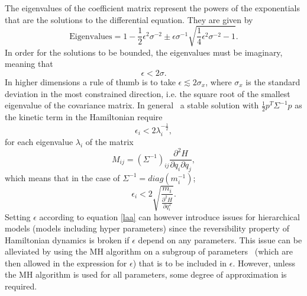 The eigenvalues of the coefficient matrix represent the powers of the exponentials that are the solutions to the differential equation. They are given by
\begin{equation}
	\text{Eigenvalues}=1-\frac{1}{2}\epsilon^2\sigma^{-2}\pm \epsilon\sigma^{-1}\sqrt{\frac{1}{4}\epsilon^2\sigma^{-2}-1}.
\end{equation}
In order for the solutions to be bounded, the eigenvalues must be imaginary, meaning that
\begin{equation}
	\epsilon<2 \sigma.
	\label{gh}
\end{equation}
In higher dimensions a rule of thumb is to take $\epsilon\lesssim 2\sigma_x$, where $\sigma_x$ is the standard deviation in the most constrained direction, i.e. the square root of the smallest eigenvalue of the covariance matrix. In general~\citep{Betancourt2013} a stable solution with $\frac{1}{2}p^T\Sigma^{-1}p$ as the kinetic term in the Hamiltonian require 
\begin{equation}
	\epsilon_i<2 \lambda_i^{-\frac{1}{2}},
	\label{laa}
\end{equation}
for each eigenvalue $\lambda_i$ of the matrix
\begin{equation}
	M_{ij}=(\Sigma^{-1})_{ij}\frac{\partial^2 H}{\partial q_i\partial q_j},
\end{equation}
which means that in the case of $\Sigma^{-1}=diag(m_i^{-1})$;
\begin{equation}
	\epsilon_i<2\sqrt{\frac{m_i}{\frac{\partial^2H}{\partial q^2_i}}}.
	\label{heu}
\end{equation}
Setting $\epsilon$ according to equation \eqref{laa} can however introduce issues for hierarchical models (models including hyper parameters) since the reversibility property of Hamiltonian dynamics is broken if $\epsilon$ depend on any parameters. This issue can be alleviated by using the MH algorithm on a subgroup of parameters~\citep{Neal:1996,Neal2012} (which are then allowed in the expression for $\epsilon$) that is to be included in $\epsilon$. However, unless the MH algorithm is used for all parameters, some degree of approximation is required. 
\vspace{5mm} %

